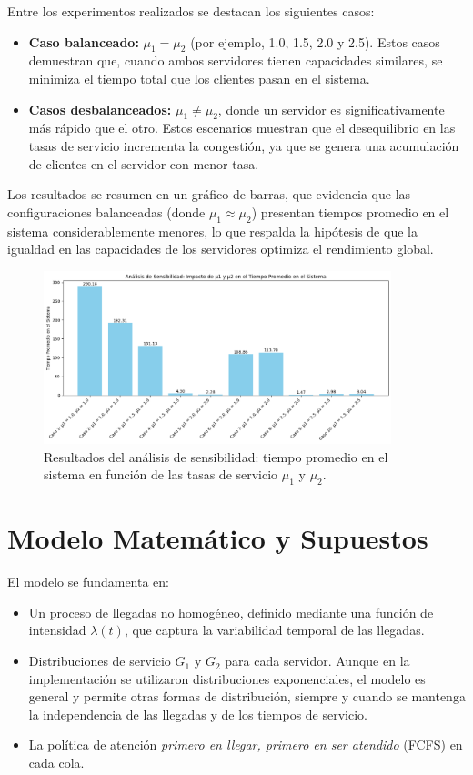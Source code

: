\documentclass[12pt]{article}
\begin{document}
Entre los experimentos realizados se destacan los siguientes casos:
\begin{itemize}
    \item \textbf{Caso balanceado:} \(\mu_1 = \mu_2\) (por ejemplo, 1.0, 1.5, 2.0 y 2.5). Estos casos demuestran que, cuando ambos servidores tienen capacidades similares, se minimiza el tiempo total que los clientes pasan en el sistema.
    \item \textbf{Casos desbalanceados:} \(\mu_1 \neq \mu_2\), donde un servidor es significativamente más rápido que el otro. Estos escenarios muestran que el desequilibrio en las tasas de servicio incrementa la congestión, ya que se genera una acumulación de clientes en el servidor con menor tasa.
\end{itemize}

Los resultados se resumen en un gráfico de barras, que evidencia que las configuraciones balanceadas (donde \(\mu_1 \approx \mu_2\)) presentan tiempos promedio en el sistema considerablemente menores, lo que respalda la hipótesis de que la igualdad en las capacidades de los servidores optimiza el rendimiento global.

\begin{figure}[H]
    \centering
    \includegraphics[width=0.9\textwidth]{results2.png}
    \caption{Resultados del análisis de sensibilidad: tiempo promedio en el sistema en función de las tasas de servicio \(\mu_1\) y \(\mu_2\).}
    \label{fig:results2}
\end{figure}

\section{Modelo Matemático y Supuestos}
El modelo se fundamenta en:
\begin{itemize}
    \item Un proceso de llegadas no homogéneo, definido mediante una función de intensidad \( \lambda(t) \), que captura la variabilidad temporal de las llegadas.
    \item Distribuciones de servicio \( G_1 \) y \( G_2 \) para cada servidor. Aunque en la implementación se utilizaron distribuciones exponenciales, el modelo es general y permite otras formas de distribución, siempre y cuando se mantenga la independencia de las llegadas y de los tiempos de servicio.
    \item La política de atención \textit{primero en llegar, primero en ser atendido} (FCFS) en cada cola.
\end{itemize}
\end{document}

